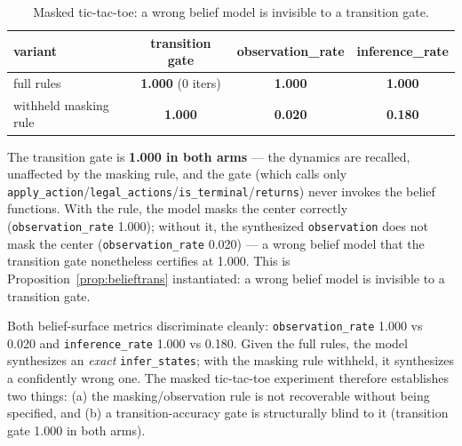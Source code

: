 \documentclass[11pt]{article}
\theoremstyle{remark}
\begin{document}
\begin{table}[ht]
\centering
\small
\begin{tabular}{lccc}
\toprule
variant & transition gate & observation\_rate & inference\_rate \\
\midrule
full rules & \textbf{1.000} (0 iters) & \textbf{1.000} & \textbf{1.000} \\
withheld masking rule & \textbf{1.000} & \textbf{0.020} & \textbf{0.180} \\
\bottomrule
\end{tabular}
\caption{Masked tic-tac-toe: a wrong belief model is invisible to a transition gate.}
\label{tab:mtt}
\end{table}

The transition gate is \textbf{1.000 in both arms} --- the dynamics are recalled, unaffected by the masking rule, and the gate (which calls only \texttt{apply\_action}/\texttt{legal\_actions}/\texttt{is\_terminal}/\texttt{returns}) never invokes the belief functions. With the rule, the model masks the center correctly (\texttt{observation\_rate} 1.000); without it, the synthesized \texttt{observation} does not mask the center (\texttt{observation\_rate} 0.020) --- a wrong belief model that the transition gate nonetheless certifies at 1.000. This is Proposition~\ref{prop:belieftrans} instantiated: a wrong belief model is invisible to a transition gate.

Both belief-surface metrics discriminate cleanly: \texttt{observation\_rate} 1.000 vs 0.020 and \texttt{inference\_rate} 1.000 vs 0.180. Given the full rules, the model synthesizes an \emph{exact} \texttt{infer\_states}; with the masking rule withheld, it synthesizes a confidently wrong one. The masked tic-tac-toe experiment therefore establishes two things: (a) the masking/observation rule is not recoverable without being specified, and (b) a transition-accuracy gate is structurally blind to it (transition gate 1.000 in both arms).
\end{document}
